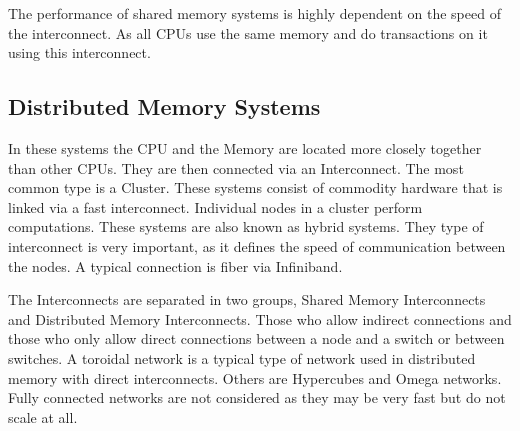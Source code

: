 \documentclass{article}
\begin{document}
The performance of shared memory systems is highly dependent on the speed of the interconnect. As all CPUs use the same memory and do transactions on it using this interconnect.

\subsection{Distributed Memory Systems} %
\label{sub:distributed_memory_systems}
In these systems the CPU and the Memory are located more closely together than other CPUs.
They are then connected via an Interconnect.
The most common type is a Cluster.
These systems consist of commodity hardware that is linked via a fast interconnect.
Individual nodes in a cluster perform computations.
These systems are also known as hybrid systems.
They type of interconnect is very important,
as it defines the speed of communication between the nodes.
A typical connection is fiber via Infiniband. 

The Interconnects are separated in two groups, Shared Memory Interconnects and Distributed Memory Interconnects.
Those who allow indirect connections and
those who only allow direct connections between a node and a switch or between switches. 
A toroidal network is a typical type of network used in distributed memory with direct interconnects. 
Others are Hypercubes and Omega networks.
Fully connected networks are not considered as they may be very fast but do not scale at all.
\end{document}
